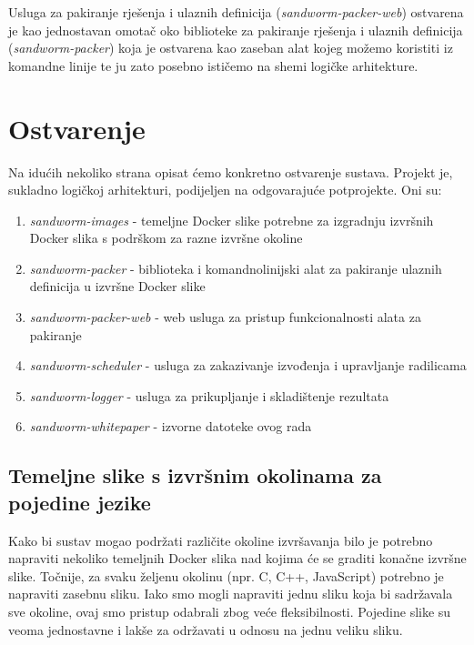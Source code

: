 \documentclass[times, utf8, zavrsni]{fer}
\begin{document}
Usluga za pakiranje rješenja i ulaznih definicija ({\textit{sandworm-packer-web}}) ostvarena je kao jednostavan omotač oko biblioteke za pakiranje rješenja i ulaznih definicija ({\textit{sandworm-packer}}) koja je ostvarena kao zaseban alat kojeg možemo koristiti iz komandne linije te ju zato posebno ističemo na shemi logičke arhitekture.


\section{Ostvarenje}
\label{sec:implementation}

Na idućih nekoliko strana opisat ćemo konkretno ostvarenje sustava. Projekt je, sukladno logičkoj arhitekturi, podijeljen na odgovarajuće potprojekte. Oni su:

\begin{enumerate}
\item {\textit{sandworm-images}} - temeljne Docker slike potrebne za izgradnju izvršnih Docker slika s podrškom za razne izvršne okoline
\item {\textit{sandworm-packer}} - biblioteka i komandnolinijski alat za pakiranje ulaznih definicija u izvršne Docker slike
\item {\textit{sandworm-packer-web}} - web usluga za pristup funkcionalnosti alata za pakiranje
\item {\textit{sandworm-scheduler}} - usluga za zakazivanje izvođenja i upravljanje radilicama
\item {\textit{sandworm-logger}} - usluga za prikupljanje i skladištenje rezultata
\item {\textit{sandworm-whitepaper}} - izvorne datoteke ovog rada
\end{enumerate}


\subsection{Temeljne slike s izvršnim okolinama za pojedine jezike}

Kako bi sustav mogao podržati različite okoline izvršavanja bilo je potrebno napraviti nekoliko temeljnih Docker slika nad kojima će se graditi konačne izvršne slike. Točnije, za svaku željenu okolinu (npr. C, C++, JavaScript) potrebno je napraviti zasebnu sliku. Iako smo mogli napraviti jednu sliku koja bi sadržavala sve okoline, ovaj smo pristup odabrali zbog veće fleksibilnosti. Pojedine slike su veoma jednostavne i lakše za održavati u odnosu na jednu veliku sliku.
\end{document}
